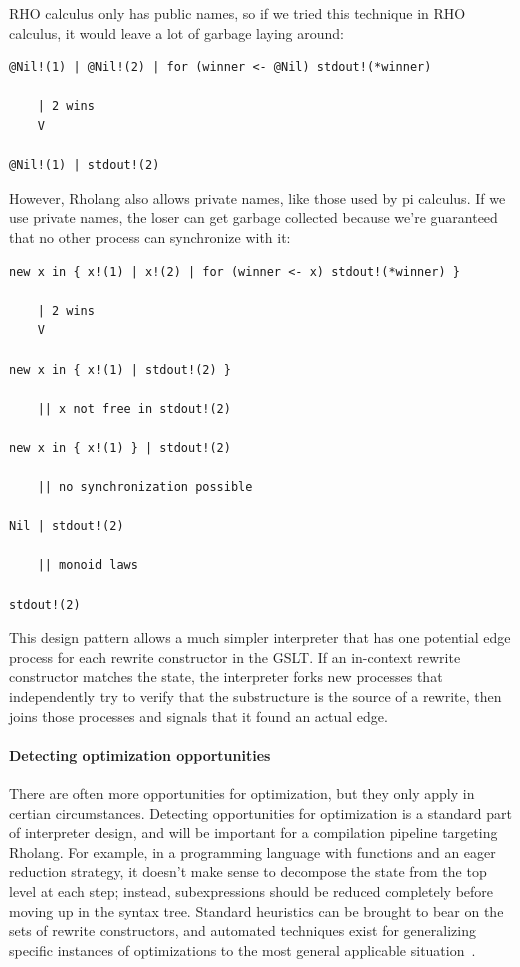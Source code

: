 \documentclass{article}
\begin{document}
RHO calculus only has public names, so if we tried this technique in RHO calculus, it would leave a lot of garbage laying around:

\begin{verbatim}
@Nil!(1) | @Nil!(2) | for (winner <- @Nil) stdout!(*winner)

    | 2 wins
    V

@Nil!(1) | stdout!(2)
\end{verbatim}

\noindent However, Rholang also allows private names, like those used by pi calculus.  If we use private names, the loser can get garbage collected because we're guaranteed that no other process can synchronize with it:

\begin{verbatim}
new x in { x!(1) | x!(2) | for (winner <- x) stdout!(*winner) }

    | 2 wins
    V

new x in { x!(1) | stdout!(2) }

    || x not free in stdout!(2)

new x in { x!(1) } | stdout!(2)

    || no synchronization possible

Nil | stdout!(2)

    || monoid laws

stdout!(2)
\end{verbatim}

This design pattern allows a much simpler interpreter that has one potential edge process for each rewrite constructor in the GSLT.  If an in-context rewrite constructor matches the state, the interpreter forks new processes that independently try to verify that the substructure is the source of a rewrite, then joins those processes and signals that it found an actual edge.

\paragraph{Detecting optimization opportunities}

There are often more opportunities for optimization, but they only apply in certian circumstances.  Detecting opportunities for optimization is a standard part of interpreter design, and will be important for a compilation pipeline targeting Rholang.  For example, in a programming language with functions and an eager reduction strategy, it doesn't make sense to decompose the state from the top level at each step; instead, subexpressions should be reduced completely before moving up in the syntax tree.  Standard heuristics can be brought to bear on the sets of rewrite constructors, and automated techniques exist for generalizing specific instances of optimizations to the most general applicable situation~\cite{Tate2010}.
\end{document}
